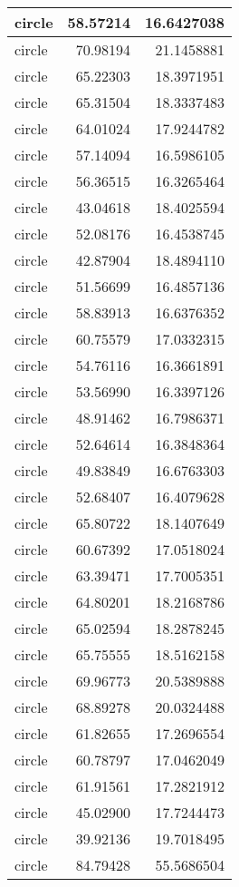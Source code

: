 \documentclass[
]{book}
\theoremstyle{definition}
\theoremstyle{definition}
\theoremstyle{definition}
\theoremstyle{definition}
\theoremstyle{remark}
\begin{document}
\begin{tabular}{l|r|r}
\hline
circle & 58.57214 & 16.6427038\\
\hline
circle & 70.98194 & 21.1458881\\
\hline
circle & 65.22303 & 18.3971951\\
\hline
circle & 65.31504 & 18.3337483\\
\hline
circle & 64.01024 & 17.9244782\\
\hline
circle & 57.14094 & 16.5986105\\
\hline
circle & 56.36515 & 16.3265464\\
\hline
circle & 43.04618 & 18.4025594\\
\hline
circle & 52.08176 & 16.4538745\\
\hline
circle & 42.87904 & 18.4894110\\
\hline
circle & 51.56699 & 16.4857136\\
\hline
circle & 58.83913 & 16.6376352\\
\hline
circle & 60.75579 & 17.0332315\\
\hline
circle & 54.76116 & 16.3661891\\
\hline
circle & 53.56990 & 16.3397126\\
\hline
circle & 48.91462 & 16.7986371\\
\hline
circle & 52.64614 & 16.3848364\\
\hline
circle & 49.83849 & 16.6763303\\
\hline
circle & 52.68407 & 16.4079628\\
\hline
circle & 65.80722 & 18.1407649\\
\hline
circle & 60.67392 & 17.0518024\\
\hline
circle & 63.39471 & 17.7005351\\
\hline
circle & 64.80201 & 18.2168786\\
\hline
circle & 65.02594 & 18.2878245\\
\hline
circle & 65.75555 & 18.5162158\\
\hline
circle & 69.96773 & 20.5389888\\
\hline
circle & 68.89278 & 20.0324488\\
\hline
circle & 61.82655 & 17.2696554\\
\hline
circle & 60.78797 & 17.0462049\\
\hline
circle & 61.91561 & 17.2821912\\
\hline
circle & 45.02900 & 17.7244473\\
\hline
circle & 39.92136 & 19.7018495\\
\hline
circle & 84.79428 & 55.5686504\\

\end{tabular}
\end{document}
